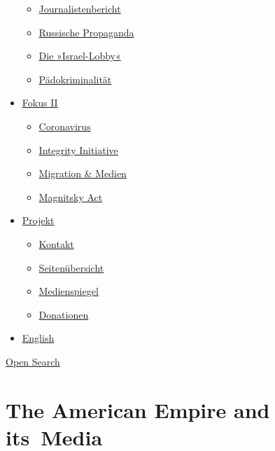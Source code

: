 \begin{itemize}
  \begin{itemize}
  \tightlist
  \item
    \href{https://swprs.org/bericht-eines-journalisten/}{Journalistenbericht}
  \item
    \href{https://swprs.org/russische-propaganda/}{Russische Propaganda}
  \item
    \href{https://swprs.org/die-israel-lobby-fakten-und-mythen/}{Die
    »Israel-Lobby«}
  \item
    \href{https://swprs.org/geopolitik-und-paedokriminalitaet/}{Pädokriminalität}
  \end{itemize}
\item
  \href{https://swprs.org/migration-und-medien/}{Fokus II}

  \begin{itemize}
  \tightlist
  \item
    \href{https://swprs.org/covid-19-hinweis-ii/}{Coronavirus}
  \item
    \href{https://swprs.org/die-integrity-initiative/}{Integrity
    Initiative}
  \item
    \href{https://swprs.org/migration-und-medien/}{Migration \& Medien}
  \item
    \href{https://swprs.org/der-fall-magnitsky/}{Magnitsky Act}
  \end{itemize}
\item
  \href{https://swprs.org/kontakt/}{Projekt}

  \begin{itemize}
  \tightlist
  \item
    \href{https://swprs.org/kontakt/}{Kontakt}
  \item
    \href{https://swprs.org/uebersicht/}{Seitenübersicht}
  \item
    \href{https://swprs.org/medienspiegel/}{Medienspiegel}
  \item
    \href{https://swprs.org/donationen/}{Donationen}
  \end{itemize}
\item
  \href{https://swprs.org/contact/}{English}
\end{itemize}

\protect\hyperlink{}{Open Search}

\hypertarget{the-american-empire-and-its-media}{%
\section{The American Empire and
its~Media}\label{the-american-empire-and-its-media}}

